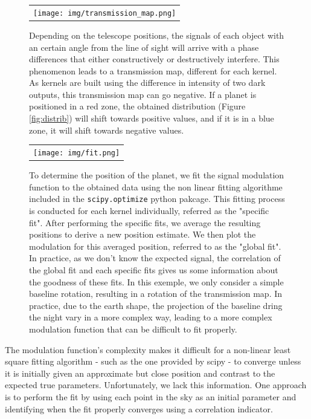 \documentclass[]{spie}  %
\begin{document}
\begin{figure} [H]
    \begin{center}
    \begin{tabular}{c}
    \texttt{[image: img/transmission\_map.png]}
    \end{tabular}
    \end{center}
    \caption[transmission_map] 
    { \label{fig:transmission_map} 
    Depending on the telescope positions, the signals of each object with an certain angle from the line of sight will arrive with a phase differences that either constructively or destructively interfere. This phenomenon leads to a transmission map, different for each kernel. As kernels are built using the difference in intensity of two dark outputs, this transmission map can go negative. If a planet is positioned in a red zone, the obtained distribution (Figure \ref{fig:distrib}) will shift towards positive values, and if it is in a blue zone, it will shift towards negative values.}
\end{figure}

\begin{figure} [H]
    \begin{center}
    \begin{tabular}{c}
    \texttt{[image: img/fit.png]}
    \end{tabular}
    \end{center}
    \caption[fit] 
    {\label{fig:fit} 
    To determine the position of the planet, we fit the signal modulation function to the obtained data using the non linear fitting algorithme included in the \lstinline{scipy.optimize} python pakcage. This fitting process is conducted for each kernel individually, referred as the "specific fit". After performing the specific fits, we average the resulting positions to derive a new position estimate. We then plot the modulation for this averaged position, referred to as the "global fit". In practice, as we don't know the expected signal, the correlation of the global fit and each specific fits gives us some information about the goodness of these fits. In this exemple, we only consider a simple baseline rotation, resulting in a rotation of the transmission map. In practice, due to the earth shape, the projection of the baseline dring the night vary in a more complex way, leading to a more complex modulation function that can be difficult to fit properly.}
\end{figure}

The modulation function's complexity makes it difficult for a non-linear least square fitting algorithm - such as the one provided by scipy -  to converge unless it is initially given an approximate but close position and contrast to the expected true parameters. Unfortunately, we lack this information. One approach is to perform the fit by using each point in the sky as an initial parameter and identifying when the fit properly converges using a correlation indicator.
\end{document}
